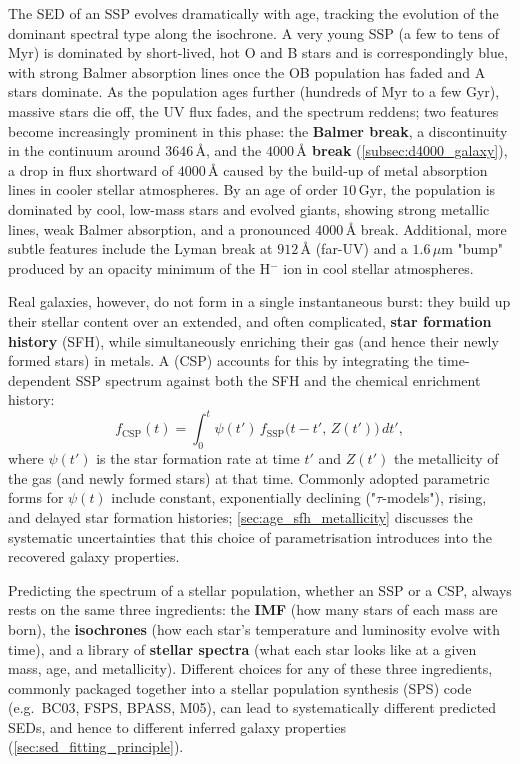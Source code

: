 The SED of an SSP evolves dramatically with age, tracking the evolution of the dominant spectral type along the isochrone. A very young SSP (a few to tens of Myr) is dominated by short-lived, hot O and B stars and is correspondingly blue, with strong Balmer absorption lines once the OB population has faded and A stars dominate. As the population ages further (hundreds of Myr to a few Gyr), massive stars die off, the UV flux fades, and the spectrum reddens; two features become increasingly prominent in this phase: the \textbf{Balmer break}, a discontinuity in the continuum around $3646\,\text{\AA}$, and the \textbf{$4000\,\text{\AA}$ break} (\cref{subsec:d4000_galaxy}), a drop in flux shortward of $4000\,\text{\AA}$ caused by the build-up of metal absorption lines in cooler stellar atmospheres. By an age of order $10\,\text{Gyr}$, the population is dominated by cool, low-mass stars and evolved giants, showing strong metallic lines, weak Balmer absorption, and a pronounced $4000\,\text{\AA}$ break. Additional, more subtle features include the Lyman break at $912\,\text{\AA}$ (far-UV) and a $1.6\,\mu\text{m}$ "bump" produced by an opacity minimum of the H$^-$ ion in cool stellar atmospheres.

\medskip

Real galaxies, however, do not form in a single instantaneous burst: they build up their stellar content over an extended, and often complicated, \textbf{star formation history} (SFH), while simultaneously enriching their gas (and hence their newly formed stars) in metals. A  (CSP) accounts for this by integrating the time-dependent SSP spectrum against both the SFH and the chemical enrichment history:
$$
f_{\text{CSP}}(t) = \int_0^t \psi(t')\, f_{\text{SSP}}\big(t-t',\, Z(t')\big)\, dt' ,
$$
where $\psi(t')$ is the star formation rate at time $t'$ and $Z(t')$ the metallicity of the gas (and newly formed stars) at that time. Commonly adopted parametric forms for $\psi(t)$ include constant, exponentially declining ("$\tau$-models"), rising, and delayed star formation histories; \cref{sec:age_sfh_metallicity} discusses the systematic uncertainties that this choice of parametrisation introduces into the recovered galaxy properties.

\begin{tipsblock}
Predicting the spectrum of a stellar population, whether an SSP or a CSP, always rests on the same three ingredients: the \textbf{IMF} (how many stars of each mass are born), the \textbf{isochrones} (how each star's temperature and luminosity evolve with time), and a library of \textbf{stellar spectra} (what each star looks like at a given mass, age, and metallicity). Different choices for any of these three ingredients, commonly packaged together into a stellar population synthesis (SPS) code (e.g.\ BC03, FSPS, BPASS, M05), can lead to systematically different predicted SEDs, and hence to different inferred galaxy properties (\cref{sec:sed_fitting_principle}).
\end{tipsblock}

